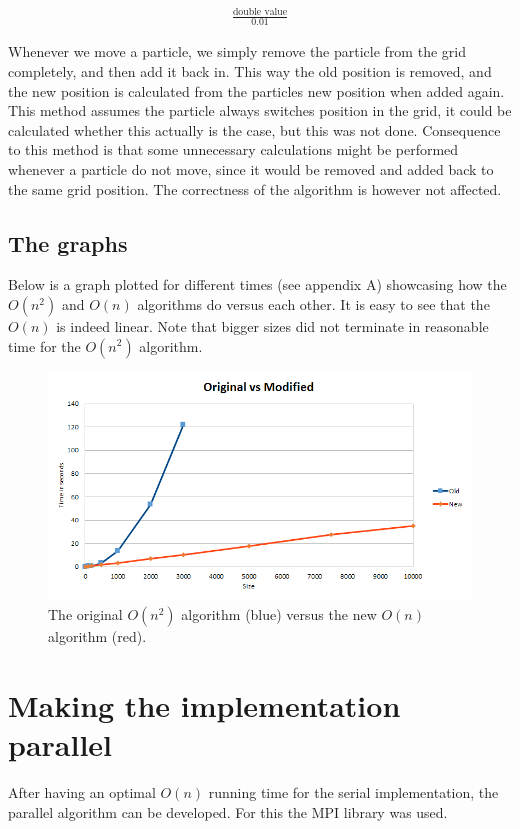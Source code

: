 \documentclass[a4paper,11pt,oneside]{book}
\begin{document}
\begin{align*}
\frac{\text{double value}}{0.01}
\end{align*}

Whenever we move a particle, we simply remove the particle from the grid completely, and then add it back in. This way the old position is removed, and the new position is calculated from the particles new position when added again. \\
This method assumes the particle always switches position in the grid, it could be calculated whether this actually is the case, but this was not done. Consequence to this method is that some unnecessary calculations might be performed whenever a particle do not move, since it would be removed and added back to the same grid position. The correctness of the algorithm is however not affected.

\section{The graphs}
Below is a graph plotted for different times (see appendix A) showcasing how the $O(n^{2})$ and $O(n)$ algorithms do versus each other. It is easy to see that the $O(n)$ is indeed linear. Note that bigger sizes did not terminate in reasonable time for the $O(n^{2})$ algorithm.

\begin{figure}[H]
  \centering
  \begin{minipage}[b]{0.9\textwidth}
    \includegraphics[width=\textwidth]{graph_regular.png}
    \caption{The original $O(n^{2})$ algorithm (blue) versus the new $O(n)$ algorithm (red).}
  \end{minipage}
\end{figure}


\chapter{Making the implementation parallel}
After having an optimal $O(n)$ running time for the serial implementation, the parallel algorithm can be developed. For this the MPI library was used.
\end{document}

